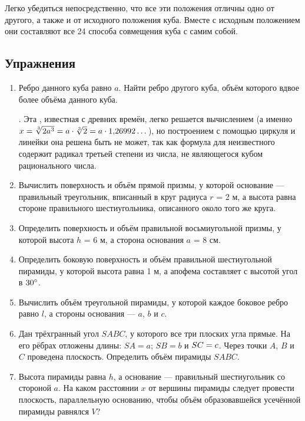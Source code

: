 Легко убедиться непосредственно, что все эти положения отличны одно от другого, а также и от исходного положения куба.
Вместе с исходным положением они составляют все 24 способа совмещения куба с самим собой.


\subsection*{Упражнения}

\begin{enumerate}

\item
Ребро данного куба равно $a$.
Найти ребро другого куба, объём которого вдвое более объёма данного куба.

\medskip

.
Эта , известная с древних времён, легко решается вычислением (а именно $x=\sqrt[3]{2a^3}=a\cdot\sqrt[3]{2}\z=a\cdot1{,}26992 \dots $), но построением с помощью циркуля и линейки она решена быть не может, так как формула для неизвестного содержит радикал третьей степени из числа, не являющегося кубом рационального числа.

\item
Вычислить поверхность и объём прямой призмы, у которой основание — правильный треугольник, вписанный в круг радиуса $r$ = 2 м, а высота равна стороне правильного шестиугольника, описанного около того же круга.

\item
Определить поверхность и объём правильной восьмиугольной призмы, у которой высота $h$ = 6 м, а сторона основания $a$ = 8 см.

\item
Определить боковую поверхность и объём правильной шестиугольной пирамиды, у которой высота равна 1 м, а апофема составляет с высотой угол в $30\degree$.

\item
Вычислить объём треугольной пирамиды, у которой каждое боковое ребро равно $l$, а стороны основания — $a$, $b$ и $c$.

\item
Дан трёхгранный угол $SABC$, у которого все три плоских угла прямые.
На его рёбрах отложены длины: $SA = a$;
$SB = b$ и $SC\z=c$.
Через точки $A$, $B$ и $C$ проведена плоскость.
Определить объём пирамиды $SABC$.

\item
Высота пирамиды равна $h$, а основание — правильный шестиугольник со стороной $a$.
На каком расстоянии $x$ от вершины пирамиды следует провести плоскость, параллельную основанию, чтобы объём образовавшейся усечённой пирамиды равнялся $V$?


\end{enumerate}
